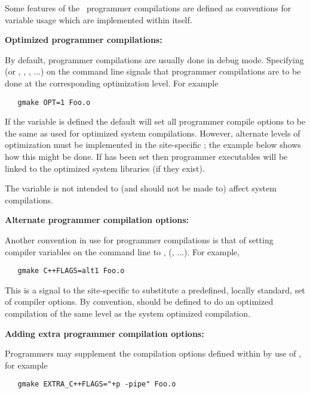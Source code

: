 Some features of the \aipspp\ programmer compilations are defined as
conventions for variable usage which are implemented within 
itself.

\textbf{Optimized programmer compilations:}

By default, programmer compilations are usually done in debug mode.
Specifying  (or , , , ...) on the
 command line signals that programmer compilations are to be
done at the corresponding optimization level.  For example

\begin{verbatim}
   gmake OPT=1 Foo.o
\end{verbatim}

\noindent
If the  variable is defined the default  will set
all programmer compile options to be the same as used for optimized system
compilations.  However, alternate levels of optimization must be implemented
in the site-specific ; the example below shows how this might
be done.  If  has been set then programmer executables will be
linked to the optimized system libraries (if they exist).

The  variable is not intended to (and should not be made to) affect
system compilations.

\textbf{Alternate programmer compilation options:}

Another convention in use for programmer compilations is that of setting
compiler  variables on the command line to ,
(, ...).  For example,

\begin{verbatim}
   gmake C++FLAGS=alt1 Foo.o
\end{verbatim}

\noindent
This is a signal to the site-specific  to substitute a
predefined, locally standard, set of compiler options.  By convention,
 should be defined to do an optimized compilation of the same level
as the system optimized compilation.

\textbf{Adding extra programmer compilation options:}

Programmers may supplement the compilation options defined within
 by use of , for example

\begin{verbatim}
   gmake EXTRA_C++FLAGS="+p -pipe" Foo.o
\end{verbatim}

